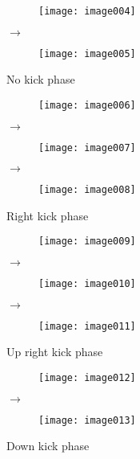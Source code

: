 \begin{figure}
\centering
\begin{subfigure}{.4\textwidth}
  \centering
  \texttt{[image: image004]}
\end{subfigure}%
$\rightarrow$
\begin{subfigure}{.4\textwidth}
  \centering
  \texttt{[image: image005]}
\end{subfigure}
\caption{\label{fig:phase1}No kick phase}
\end{figure}

\begin{figure}
\centering
\begin{subfigure}{.3\textwidth}
  \centering
  \texttt{[image: image006]}
\end{subfigure}%
$\rightarrow$
\begin{subfigure}{.3\textwidth}
  \centering
  \texttt{[image: image007]}
\end{subfigure}%
$\rightarrow$
\begin{subfigure}{.3\textwidth}
  \centering
  \texttt{[image: image008]}
\end{subfigure}
\caption{\label{fig:phase2}Right kick phase}
\end{figure}

\begin{figure}
\centering
\begin{subfigure}{.3\textwidth}
  \centering
  \texttt{[image: image009]}
\end{subfigure}%
$\rightarrow$
\begin{subfigure}{.3\textwidth}
  \centering
  \texttt{[image: image010]}
\end{subfigure}%
$\rightarrow$
\begin{subfigure}{.3\textwidth}
  \centering
  \texttt{[image: image011]}
\end{subfigure}
\caption{\label{fig:phase3}Up right kick phase}
\end{figure}

\begin{figure}
\centering
\begin{subfigure}{.4\textwidth}
  \centering
  \texttt{[image: image012]}
\end{subfigure}%
$\rightarrow$
\begin{subfigure}{.4\textwidth}
  \centering
  \texttt{[image: image013]}
\end{subfigure}
\caption{\label{fig:phase4}Down kick phase}
\end{figure}

